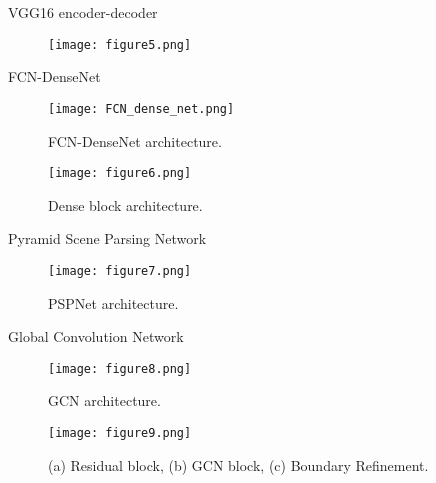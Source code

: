 \documentclass[10pt,aspectratio=169,dvipsnames]{beamer} %
\newcounter{angle}
\begin{document}
\begin{frame}{VGG16 encoder-decoder}
	\begin{figure}
		\centering
		\texttt{[image: figure5.png]}
	\end{figure}
\end{frame}

\begin{frame}{FCN-DenseNet}
	\begin{minipage}[c]{0.48\textwidth}
		\begin{figure} [h!]
			\texttt{[image: FCN\_dense\_net.png]}
			\caption{FCN-DenseNet architecture.} 
			\label{fcn}
		\end{figure}
	\end{minipage}
	\hfill
	\begin{minipage}[c]{0.48\textwidth}
		\begin{figure} [h!]
			\centering
			\texttt{[image: figure6.png]}
			\caption{Dense block architecture.} 
		\end{figure}
	\end{minipage}
\end{frame}

\begin{frame}{Pyramid Scene Parsing Network}
	\begin{figure} [h!]
		\centering
		\texttt{[image: figure7.png]}
		\caption{PSPNet architecture.} 
	\end{figure}
\end{frame}

\begin{frame}{Global Convolution Network}
		\begin{minipage}[c]{0.55\textwidth}
			\begin{figure} [h!]
				\centering
				\texttt{[image: figure8.png]}
				\caption{GCN architecture.} 
			\end{figure}	
		\end{minipage}
	\hfill
	\begin{minipage}[c]{0.35\textwidth}
		\begin{figure} [h!]
			\centering
			\texttt{[image: figure9.png]}
			\caption{(a) Residual block, (b) GCN block, (c) Boundary Refinement.} 
		\end{figure}	
	\end{minipage}

\end{frame}
\end{document}

